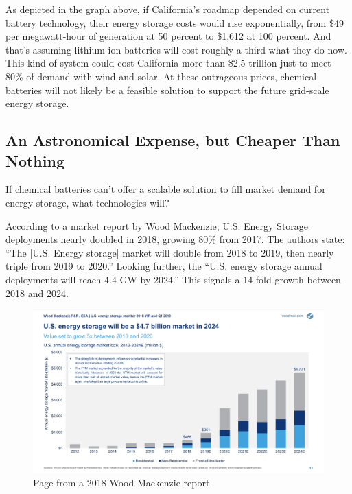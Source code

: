 \documentclass[hidelinks,12pt,a4paper]{article}
\begin{document}
As depicted in the graph above, if California's roadmap depended on current battery technology, their energy storage costs would rise exponentially, from \$49 per megawatt-hour of generation at 50 percent to \$1,612 at 100 percent. And that's assuming lithium-ion batteries will cost roughly a third what they do now. This kind of system could cost California more than \$2.5 trillion just to meet 80\% of demand with wind and solar. \cite{TheTwoPointFiveTrillionReasonWeCantRelyOnBatteries} At these outrageous prices, chemical batteries will not likely be a feasible solution to support the future grid-scale energy storage.

\subsection{An Astronomical Expense, but Cheaper Than Nothing}
If chemical batteries can't offer a scalable solution to fill market demand for energy storage, what technologies will?

According to a market report by Wood Mackenzie, U.S. Energy Storage deployments nearly doubled in 2018, growing 80\% from 2017. \cite{USEnergyStorageMonitor2018YIRAndQ12019} The authors state: “The [U.S. Energy storage] market will double from 2018 to 2019, then nearly triple from 2019 to 2020.” Looking further, the “U.S. energy storage annual deployments will reach 4.4 GW by 2024.” This signals a 14-fold growth between 2018 and 2024.

\begin{figure}[ht!]
    \centering
    \includegraphics[width=1\textwidth]{US-ESM-2018-YIR-Executive-Summary-us-energy-storage-market-in-2024.png}
    \caption{Page from a 2018 Wood Mackenzie report \cite{USEnergyStorageMonitor2018YIRAndQ12019}}
\end{figure}
\FloatBarrier
\end{document}
